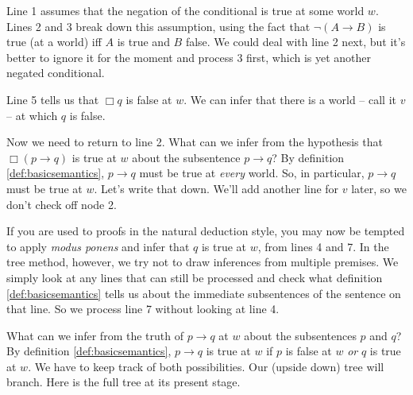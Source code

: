 Line 1 assumes that the negation of the conditional is true at some world $w$.
Lines 2 and 3 break down this assumption, using the fact that $\neg (A \to B)$
is true (at a world) iff $A$ is true and $B$ false. We could deal with line 2
next, but it's better to ignore it for the moment and process 3 first, which is
yet another negated conditional.

\begin{center}
\end{center}

Line 5 tells us that $\Box q$ is false at $w$. We can infer that there is a
world -- call it $v$ -- at which $q$ is false.

\begin{center}
\end{center}

Now we need to return to line 2. What can we infer from the hypothesis that
$\Box(p\to q)$ is true at $w$ about the subsentence $p \to q$? By definition
\ref{def:basicsemantics}, $p \to q$ must be true at \emph{every} world. So, in
particular, $p\to q$ must be true at $w$. Let's write that down. We'll add
another line for $v$ later, so we don't check off node 2.

\begin{center}
\end{center}

If you are used to proofs in the natural deduction style, you may now be tempted
to apply \emph{modus ponens} and infer that $q$ is true at $w$, from lines 4 and
7. In the tree method, however, we try not to draw inferences from multiple
premises. We simply look at any lines that can still be processed and check what
definition \ref{def:basicsemantics} tells us about the immediate subsentences of
the sentence on that line. So we process line 7 without looking at line 4.

What can we infer from the truth of $p\to q$ at $w$ about the subsentences $p$
and $q$? By definition \ref{def:basicsemantics}, $p \to q$ is true at $w$ if $p$
is false at $w$ \emph{or} $q$ is true at $w$. We have to keep track of both
possibilities. Our (upside down) tree will branch. Here is the full tree at its
present stage.


